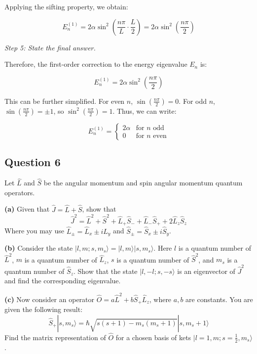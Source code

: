 \documentclass{article}
\begin{document}
Applying the sifting property, we obtain:

\[
E_n^{(1)} = 2 \alpha \sin^2\left(\frac{n \pi}{L} \cdot \frac{L}{2}\right) = 2 \alpha \sin^2\left(\frac{n \pi}{2}\right)
\]

\textit{Step 5: State the final answer.}

Therefore, the first-order correction to the energy eigenvalue \(E_n\) is:

\[
E_n^{(1)} = 2 \alpha \sin^2\left(\frac{n \pi}{2}\right)
\]

This can be further simplified. For even \(n\), \(\sin\left(\frac{n\pi}{2}\right) = 0\). For odd \(n\), \(\sin\left(\frac{n\pi}{2}\right) = \pm 1\), so \(\sin^2\left(\frac{n\pi}{2}\right) = 1\). Thus, we can write:

\[
E_n^{(1)} = 
\begin{cases}
2\alpha & \text{for } n \text{ odd} \\
0 & \text{for } n \text{ even}
\end{cases}
\]

\subsection{Question 6}

Let \(\hat{L}\) and \(\hat{S}\) be the angular momentum and spin angular momentum quantum operators.

\textbf{(a)} Given that \(\hat{J} = \hat{L} + \hat{S}\), show that
\[
\hat{J}^2 = \hat{L}^2 + \hat{S}^2 + \hat{L}_+ \hat{S}_- + \hat{L}_- \hat{S}_+ + 2 \hat{L}_z \hat{S}_z
\]
Where you may use \(\hat{L}_\pm = \hat{L}_x \pm i \hat{L}_y\) and \(\hat{S}_\pm = \hat{S}_x \pm i \hat{S}_y\).

\textbf{(b)} Consider the state \(|l, m; s, m_s\rangle = |l, m\rangle |s, m_s\rangle\). Here \(l\) is a quantum number of \(\hat{L}^2\), \(m\) is a quantum number of \(\hat{L}_z\), \(s\) is a quantum number of \(\hat{S}^2\), and \(m_s\) is a quantum number of \(\hat{S}_z\). Show that the state \(|l, -l; s, -s\rangle\) is an eigenvector of \(\hat{J}^2\) and find the corresponding eigenvalue.

\textbf{(c)} Now consider an operator \(\hat{O} = a \hat{L}^2 + b \hat{S}_+ \hat{L}_z\), where \(a, b\) are constants. You are given the following result:
\[
\hat{S}_+ |s, m_s\rangle = \hbar \sqrt{s(s+1) - m_s(m_s + 1)} |s, m_s + 1\rangle
\]
Find the matrix representation of \(\hat{O}\) for a chosen basis of kets \(|l = 1, m; s = \frac{1}{2}, m_s\rangle\).
\end{document}

